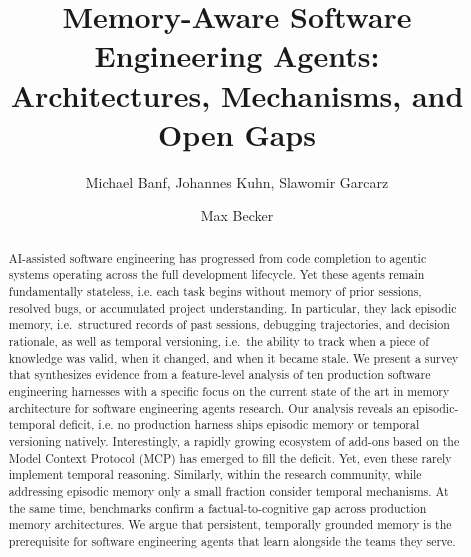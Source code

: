 \documentclass[runningheads]{llncs}
\begin{document}
\title{Memory-Aware Software Engineering Agents:\\ Architectures, Mechanisms, and Open Gaps}


\author{Michael Banf, Johannes Kuhn, Slawomir Garcarz \and Max Becker}



\maketitle

\begin{abstract}
AI-assisted software engineering has progressed from code completion to
agentic systems operating across the full development lifecycle. Yet
these agents remain fundamentally stateless, i.e. each task begins without
memory of prior sessions, resolved bugs, or accumulated project
understanding. In particular, they lack episodic memory, i.e.\ structured records of past sessions, debugging trajectories, and decision rationale, as well as temporal versioning, i.e.\ the ability to track when a piece of knowledge was valid, when it changed, and when it became stale. We present a survey that synthesizes
evidence from a feature-level
analysis of ten production software engineering harnesses with a specific focus on the current state of the art in memory architecture
for software engineering agents research. Our analysis reveals an episodic-temporal deficit, i.e. no production harness ships
episodic memory or temporal versioning natively. Interestingly, a rapidly growing
ecosystem of add-ons based on the Model Context Protocol (MCP) has emerged to fill the
deficit. Yet, even these rarely implement temporal reasoning. Similarly, within the research community, while addressing episodic memory only a small fraction consider temporal
mechanisms. At the same time, benchmarks confirm a
factual-to-cognitive gap across production memory architectures. We argue that persistent, temporally grounded
memory is the prerequisite for software engineering agents that learn alongside the teams
they serve.

\end{abstract}
\end{document}
